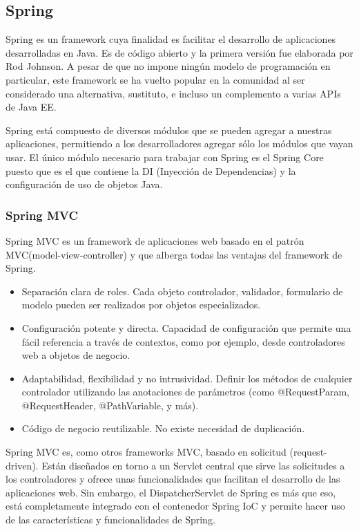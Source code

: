 \subsection{Spring}
Spring es un framework cuya finalidad es facilitar el desarrollo de aplicaciones desarrolladas en Java. Es de código abierto y la primera versión fue elaborada por Rod Johnson. A pesar de que no impone ningún modelo de programación en particular, este framework se ha vuelto popular en la comunidad al ser considerado una alternativa, sustituto, e incluso un complemento a varias APIs de Java EE.

Spring está compuesto de diversos módulos que se pueden agregar a nuestras aplicaciones, permitiendo a los desarrolladores agregar sólo los módulos que vayan usar. El único módulo necesario para trabajar con Spring es el Spring Core puesto que es el que contiene la DI (Inyección de Dependencias) y la configuración de uso de objetos Java.

\subsubsection*{Spring MVC}
Spring MVC es un framework de aplicaciones web basado en el patrón MVC(model-view-controller) y que alberga todas las ventajas del framework de Spring.
	\begin{itemize}
		 \item Separación clara de roles. Cada objeto controlador, validador, formulario de modelo pueden ser realizados por objetos especializados.
		 \item Configuración potente y directa. Capacidad de configuración que permite una fácil referencia a través de contextos, como por ejemplo, desde controladores web a objetos de negocio.
		 \item Adaptabilidad, flexibilidad y no intrusividad. Definir los métodos de cualquier controlador utilizando las anotaciones de parámetros (como @RequestParam, @RequestHeader, @PathVariable, y más).
		 \item Código de negocio reutilizable. No existe necesidad de duplicación.
	\end{itemize}
	
Spring MVC es, como otros frameworks MVC, basado en solicitud (request-driven). Están diseñados en torno a un Servlet central que sirve las solicitudes a los controladores y ofrece unas funcionalidades que facilitan el desarrollo de las aplicaciones web. Sin embargo, el DispatcherServlet de Spring es más que eso, está completamente integrado con el contenedor Spring IoC y permite hacer uso de las características y funcionalidades de Spring.

